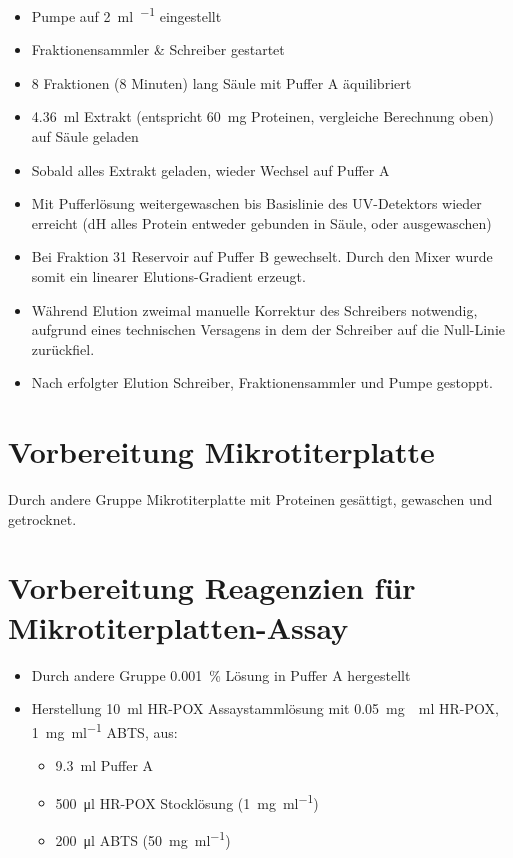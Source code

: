 \documentclass[a4paper,german]{scrreprt}
\begin{document}
\begin{itemize}
	\item Pumpe auf \SI{2}{\ml \per \min} eingestellt
	\item Fraktionensammler \& Schreiber gestartet
	\item 8 Fraktionen (8 Minuten) lang Säule mit Puffer A äquilibriert
	\item \SI{4.36}{ml} Extrakt (entspricht \SI{60}{mg} Proteinen,
		vergleiche Berechnung oben) auf Säule geladen
	\item Sobald alles Extrakt geladen, wieder Wechsel auf Puffer A
	\item Mit Pufferlösung weitergewaschen bis Basislinie des UV-Detektors
		wieder erreicht (dH alles Protein entweder gebunden in Säule,
		oder ausgewaschen)
	\item Bei Fraktion 31 Reservoir auf Puffer B gewechselt. Durch den
		Mixer wurde somit ein linearer Elutions-Gradient erzeugt.
	\item Während Elution zweimal manuelle Korrektur des Schreibers
		notwendig, aufgrund eines technischen Versagens in dem der
		Schreiber auf die Null-Linie zurückfiel.
	\item Nach erfolgter Elution Schreiber, Fraktionensammler und Pumpe gestoppt.
\end{itemize}

\section{Vorbereitung Mikrotiterplatte}

Durch andere Gruppe Mikrotiterplatte mit Proteinen gesättigt, gewaschen und
getrocknet.

\section{Vorbereitung Reagenzien für Mikrotiterplatten-Assay}

\begin{itemize}
	\item Durch andere Gruppe \SI{0.001}{\percent}  Lösung in Puffer A hergestellt
	\item Herstellung \SI{10}{ml} HR-POX Assaystammlösung mit \SI{0.05}{\mg
		\per \ml} HR-POX, \SI{1}{\mg \per \ml} ABTS, aus:
		\begin{itemize}
			\item \SI{9.3}{\ml} Puffer A
			\item \SI{500}{\ul} HR-POX Stocklösung (\SI{1}{\mg \per \ml})
			\item \SI{200}{\ul} ABTS (\SI{50}{\mg \per \ml})
		\end{itemize}
\end{itemize}
\end{document}
